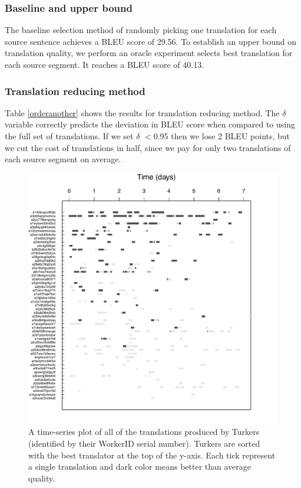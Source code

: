 \documentclass[11pt,letterpaper]{article}
\begin{document}
\subsubsection{Baseline and upper bound} 
The baseline selection method of randomly picking one translation for each source sentence achieves a BLEU score of 29.56. To establish an upper bound on translation quality, we perform an oracle experiment selects best translation for each source segment.  It reaches a BLEU score of 40.13.

\subsubsection{Translation reducing method} 

Table \ref{orderanother} shows the results for translation reducing method.  The $\delta$ variable correctly predicts the deviation in BLEU score when compared to using the full set of translations.   If we set $\delta$ $<$0.95 then we lose 2 BLEU points, but we cut the cost of translations in half, since we pay for only two translations of each source segment on average.


\begin{figure}
  \centering
  \includegraphics[width=\linewidth]{WorkerPerf/wp.pdf}
  \caption{A time-series plot of all of the translations produced by Turkers (identified by their WorkerID serial number). Turkers are sorted with the best translator at the top of the y-axis. Each tick represent a single translation and dark color means better than average quality.
}
    \label{fworkerperf}
\end{figure}
\end{document}
